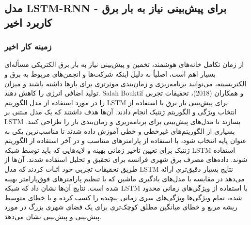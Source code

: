 \documentclass{CSICC2020}
\begin{document}
\subsection{مدل LSTM-RNN برای پیش‌بینی نیاز به بار برق - کاربرد اخیر}

\subsubsection{زمینه کار اخیر}
از زمان تکامل خانه‌های هوشمند، تخمین و پیش‌بینی نیاز به بار برق الکتریکی مسأله‌ای بسیار اهم است، اصلیاً به دلیل اینکه شرکت‌ها و انجمن‌های مربوط به برق و الکتریسیته، می‌توانند برنامه‌ریزی و زمان‌بندی موثرتری برای بارها داشته باشند و میزان تولید اضافی انرژی را کاهش دهند. Salah Bouktif و همکاران (2018)، تحقیقات تجربی را در مورد استفاده از مدل الگوریتم LSTM برای پیش‌بینی بار برق با استفاده از انتخاب ویژگی و الگوریتم ژنتیک انجام دادند. آن‌ها هدف داشتند که یک مدل مبتنی بر LSTM بسازند تا مدل‌های پیش‌بینی برای برنامه‌ریزی و زمان‌بندی بار را طراحی کنند. بسیاری از الگوریتم‌های غیرخطی و خطی آموزش داده شدند تا مناسب‌ترین یکی به عنوان پایه انتخاب شود، با استفاده از پارامترهای متناسب و در آخر استفاده از الگوریتم ژنتیک برای تعیین تاخیر زمانی بهینه و لایه‌هایی که باید توسط شبکه LSTM استفاده شوند. داده‌های مصرف برق شهری فرانسه برای تحقیق و تحلیل استفاده شدند. آن‌ها از طریق تحقیقات تجربی خود اثبات کردند که مدل LSTM نتایج بسیار دقیق‌تری ارائه می‌دهد در مقایسه با مدل‌های یادگیری ماشین که با تنظیم پارامترهای فوق‌پارامتر بهینه شده است. نتایج آن‌ها نشان داد که شبکه LSTM با استفاده از ویژگی‌های زمانی محدود شده، تمام ویژگی‌ها ویژگی‌های سری زمانی پیچیده را کسب کرده و با خطای متوسط ریشه مربع و خطای میانگین مطلق کوچک‌تری برای یک فضای شهری بزرگ در مورد پیش‌بینی و پیش‌بینی نشان می‌دهد. 
\end{document}
